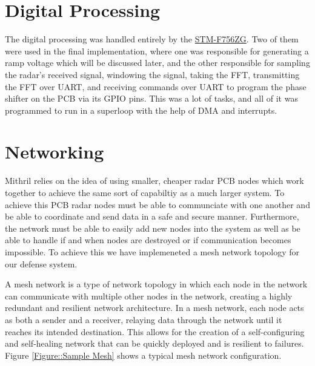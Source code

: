 \section{Digital Processing}
The digital processing was handled entirely by the \href{https://www.st.com/en/evaluation-tools/nucleo-f756zg.html}{STM-F756ZG}.
Two of them were used in the final implementation, where one was responsible for generating a ramp voltage which will be discussed
later, and the other responsible for sampling the radar's received signal, windowing the signal, taking the FFT, transmitting 
the FFT over UART, and receiving commands over UART to program the phase shifter on the PCB via its GPIO pins. This was a lot of tasks,
and all of it was programmed to run in a superloop with the help of DMA and interrupts.

\section{Networking}
Mithril relies on the idea of using smaller, cheaper radar PCB nodes which work together to achieve the same sort of capabiltiy as a much larger system. To achieve this PCB radar nodes must be able to communciate with one another and be able to coordinate and send data in a safe and secure manner. Furthermore, the network must be able to easily add new nodes into the system as well as be able to handle if and when nodes are destroyed or if communication becomes impossible. To achieve this we have implemeneted a mesh network topology for our defense system.

A mesh network is a type of network topology in which each node in the network can communicate with multiple other nodes in the network, creating a highly redundant and resilient network architecture. In a mesh network, each node acts as both a sender and a receiver, relaying data through the network until it reaches its intended destination. This allows for the creation of a self-configuring and self-healing network that can be quickly deployed and is resilient to failures. Figure \ref{Figure::Sample Mesh}  shows a typical mesh network configuration.


